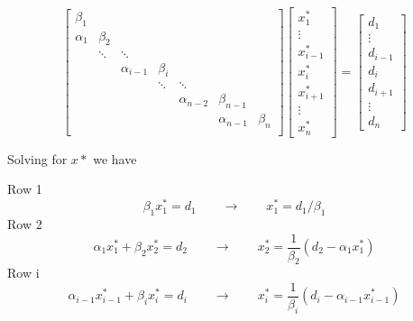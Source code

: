 \documentclass[landscape]{article}
\begin{document}
\[
\left[\begin{array}{ccccccccc}
\beta_{1}  &               &              &              &              &             &           \\
\alpha_{1} & \beta_{2}     &              &              &              &             &           \\
           & \ddots        & \ddots       &              &              &             &           \\
           &               & \alpha_{i-1} & \beta_{i}    &              &             &           \\
           &               &              & \ddots       & \ddots       &             &           \\
           &               &              &              & \alpha_{n-2} & \beta_{n-1} &           \\
           &               &              &              &              & \alpha_{n-1}& \beta_{n} \\
\end{array} \right] 
\left[ \begin{array}{c}
x^*_{1} \\ \vdots \\ x^*_{i-1} \\ x^*_{i} \\ x^*_{i+1} \\ \vdots \\ x^*_{n}
\end{array} \right]
=
\left[ \begin{array}{c}
d_{1} \\ \vdots \\ d_{i-1} \\ d_{i} \\ d_{i+1} \\ \vdots \\ d_{n}
\end{array} \right]
\]

Solving for $x*$ we have

Row 1
\begin{equation}
  \beta_1 x_1^* = d_1
  \qquad \rightarrow \qquad
  x_1^* = d_1/\beta_1
\end{equation}
Row 2
\begin{equation}
  \alpha_1 x_1^* + \beta_2 x_2^* = d_2
  \qquad \rightarrow \qquad
  x_2^* = \frac{1}{\beta_2} (d_2 - \alpha_1 x_1^*)
\end{equation}
Row i
\begin{equation}
  \alpha_{i-1} x_{i-1}^* + \beta_{i} x_{i}^* = d_{i}
  \qquad \rightarrow \qquad
  x_{i}^* = \frac{1}{\beta_{i}} (d_{i} - \alpha_{i-1} x_{i-1}^*)
\end{equation}
\end{document}
